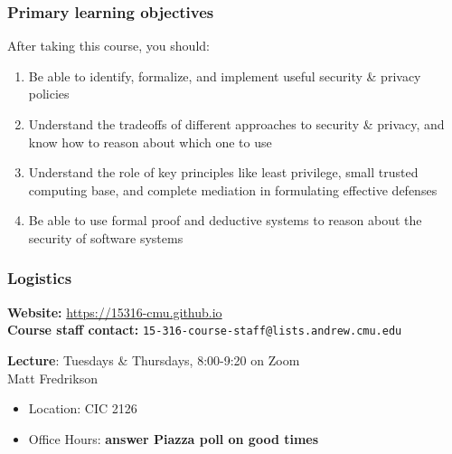 \documentclass[10pt]{beamer}
\begin{document}

\begin{frame}

\frametitle{Primary learning objectives}

After taking this course, you should:
\begin{enumerate}
  \pause\item Be able to identify, formalize, and implement useful security \& privacy policies
  \pause\item Understand the tradeoffs of different approaches to security \& privacy, and know how to reason about which one to use
  \pause\item Understand the role of key principles like least privilege, small trusted computing base, and complete mediation in formulating effective defenses
  \pause\item Be able to use formal proof and deductive systems to reason about the security of software systems
\end{enumerate}

\end{frame}


\begin{frame}

\frametitle{Logistics}

\textbf{Website:} \url{https://15316-cmu.github.io}
\\[1em]

\textbf{Course staff contact:} \texttt{15-316-course-staff@lists.andrew.cmu.edu}

\textbf{Lecture}: Tuesdays \& Thursdays, 8:00-9:20 on Zoom
\\[1em]

Matt Fredrikson
\begin{itemize}
\item Location: CIC 2126
\item Office Hours: \textbf{answer Piazza poll on good times}
\end{itemize}

\end{frame}

\end{document}

